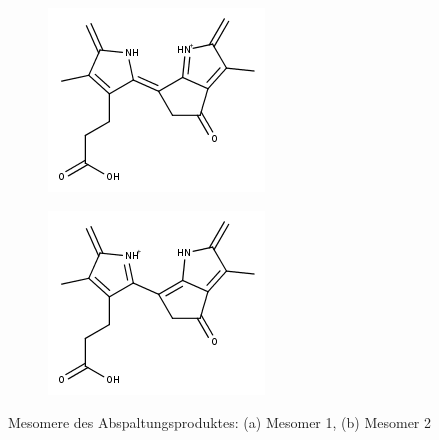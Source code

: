 
\begin{figure}[!htbp]
  \begin{subfigure}[b]{0.5\textwidth}
    \includegraphics[width=\textwidth]{figures/Kapitel7/Kataboliten/fragmentation_structures/VWA_Katabolit_619-CO2-RingD-RingA_311_Mesomer1.png}
    \caption{}
    \label{fig:311MHMesomer2}
  \end{subfigure}
  \hfill
  \begin{subfigure}[b]{0.5\textwidth}
    \includegraphics[width=\textwidth]{figures/Kapitel7/Kataboliten/fragmentation_structures/VWA_Katabolit_619-CO2-RingD-RingA_311_Mesomer2.png}
    \caption{}
    \label{fig:311MHMesomer3}
  \end{subfigure}
  \caption[2 Mesomere für potentielle Abspaltungsprodukte von Bo-DNCC, Quelle: Autor]{Mesomere des Abspaltungsproduktes: (a) Mesomer 1, (b) Mesomer 2}
\end{figure}

